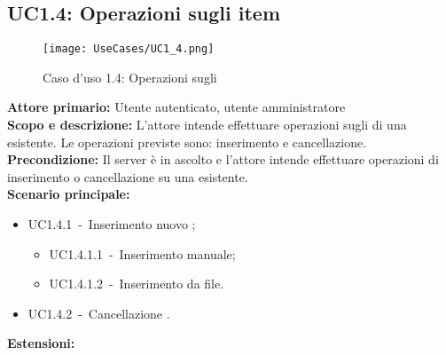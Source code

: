 \documentclass{scalatekids-article}
\begin{document}
\subsection{UC1.4: Operazioni sugli item}

\begin{figure}[H]
  \begin{center}
    \texttt{[image: UseCases/UC1\_4.png]}
    \caption*{Caso d'uso 1.4: Operazioni sugli }
  \end{center}
\end{figure}
\textbf{Attore primario:} Utente autenticato, utente amministratore\\
\textbf{Scopo e descrizione:} L'attore intende effettuare operazioni sugli  di una  esistente. Le operazioni previste sono:
inserimento e cancellazione.\\
\textbf{Precondizione:} Il server è in ascolto e l'attore intende effettuare operazioni di inserimento o cancellazione su una  esistente.\\
\textbf{Scenario principale:}
\begin{itemize}
\item UC1.4.1\ -\ Inserimento nuovo ;
  \begin{itemize}
  \item UC1.4.1.1\ -\ Inserimento  manuale;
  \item UC1.4.1.2\ -\ Inserimento  da file.
  \end{itemize}
\item UC1.4.2\ -\ Cancellazione .
\end{itemize}
\textbf{Estensioni:}
\end{document}

